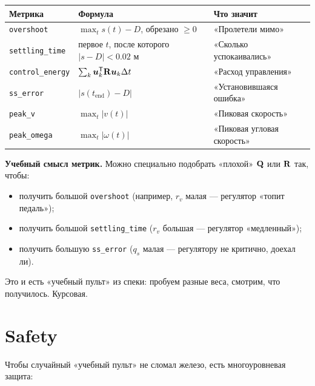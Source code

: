 \begin{center}
\begin{tabular}{lll}
\toprule
\textbf{Метрика} & \textbf{Формула} & \textbf{Что значит}\\
\midrule
\texttt{overshoot} & $\max_t s(t) - D$, обрезано $\ge 0$ & «Пролетели мимо»\\
\texttt{settling\_time} & первое $t$, после которого $|s-D| < 0.02$ м & «Сколько успокаивались»\\
\texttt{control\_energy} & $\sum_k \bm{u}_k^{\mathsf{T}} \mathbf{R}\bm{u}_k \Delta t$ & «Расход управления»\\
\texttt{ss\_error} & $|s(t_\text{end}) - D|$ & «Установившаяся ошибка»\\
\texttt{peak\_v} & $\max_t |v(t)|$ & «Пиковая скорость»\\
\texttt{peak\_omega} & $\max_t |\omega(t)|$ & «Пиковая угловая скорость»\\
\bottomrule
\end{tabular}
\end{center}

\begin{ideabox}
\textbf{Учебный смысл метрик.} Можно специально подобрать «плохой»
$\mathbf{Q}$ или $\mathbf{R}$ так, чтобы:
\begin{itemize}
  \item получить большой \texttt{overshoot} (например, $r_v$ малая ---
        регулятор «топит педаль»);
  \item получить большой \texttt{settling\_time} ($r_v$ большая ---
        регулятор «медленный»);
  \item получить большую \texttt{ss\_error} ($q_s$ малая --- регулятору
        не критично, доехал ли).
\end{itemize}
Это и есть «учебный пульт» из спеки: пробуем разные веса, смотрим, что
получилось. Курсовая.
\end{ideabox}

\section{Safety}

Чтобы случайный «учебный пульт» не сломал железо, есть многоуровневая
защита:

